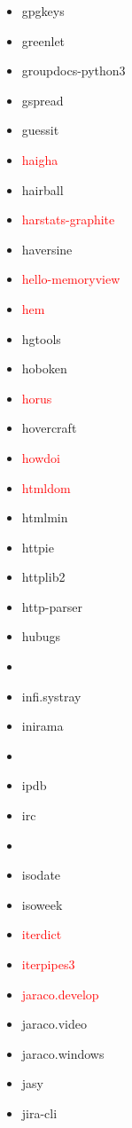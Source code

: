 \documentclass{l4proj}
\begin{document}
\begin{appendices}
{\begin{itemize}
\item gpgkeys
\item greenlet
\item groupdocs-python3
\item gspread
\item guessit
\item\textcolor{red}{haigha}
\item hairball
\item\textcolor{red}{harstats-graphite}
\end{itemize}
}%
\noindent\parbox[t]{0.32\textwidth}{\raggedright%
\begin{itemize}
\item haversine
\item\textcolor{red}{hello-memoryview}
\item\textcolor{red}{hem}
\item hgtools
\item hoboken
\item\textcolor{red}{horus}
\item hovercraft
\item\textcolor{red}{howdoi}
\item\textcolor{red}{htmldom}
\item htmlmin
\item httpie
\item httplib2
\item http-parser
\item hubugs
\item\textcolor{red}{}
\item infi.systray
\item inirama
\item {}
\item ipdb
\item irc
\item\textcolor{red}{}
\item isodate
\item isoweek
\item\textcolor{red}{iterdict}
\item\textcolor{red}{iterpipes3}
\item\textcolor{red}{jaraco.develop}
\item jaraco.video
\item jaraco.windows
\item jasy
\item jira-cli
\end{itemize}
}%
\clearpage
\noindent\parbox[t]{0.32\textwidth}{\raggedright%
}
\end{appendices}
\end{document}
